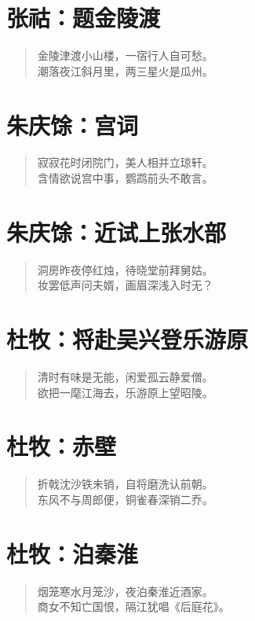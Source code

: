 \documentclass[12pt,oneside]{book}
\newenvironment{shici}{%
\begin{verse}\centering\yanti\large\hspace{12pt}}{\end{verse}}
\begin{document}
\begin{common-format}
\chapter{张祜：题金陵渡}
\begin{shici}
金陵津渡小山楼，一宿行人自可愁。\\
潮落夜江斜月里，两三星火是瓜州。
\end{shici}

\chapter{朱庆馀：宫词}
\begin{shici}
寂寂花时闭院门，美人相并立琼轩。\\
含情欲说宫中事，鹦鹉前头不敢言。
\end{shici}

\chapter{朱庆馀：近试上张水部}
\begin{shici}
洞房昨夜停红烛，待晓堂前拜舅姑。\\
妆罢低声问夫婿，画眉深浅入时无？
\end{shici}

\chapter{杜牧：将赴吴兴登乐游原}
\begin{shici}
清时有味是无能，闲爱孤云静爱僧。\\
欲把一麾江海去，乐游原上望昭陵。
\end{shici}

\chapter{杜牧：赤壁}
\begin{shici}
折戟沈沙铁未销，自将磨洗认前朝。\\
东风不与周郎便，铜雀春深销二乔。
\end{shici}

\chapter{杜牧：泊秦淮}
\begin{shici}
烟笼寒水月笼沙，夜泊秦淮近酒家。\\
商女不知亡国恨，隔江犹唱《后庭花》。
\end{shici}


\end{common-format}
\end{document}
